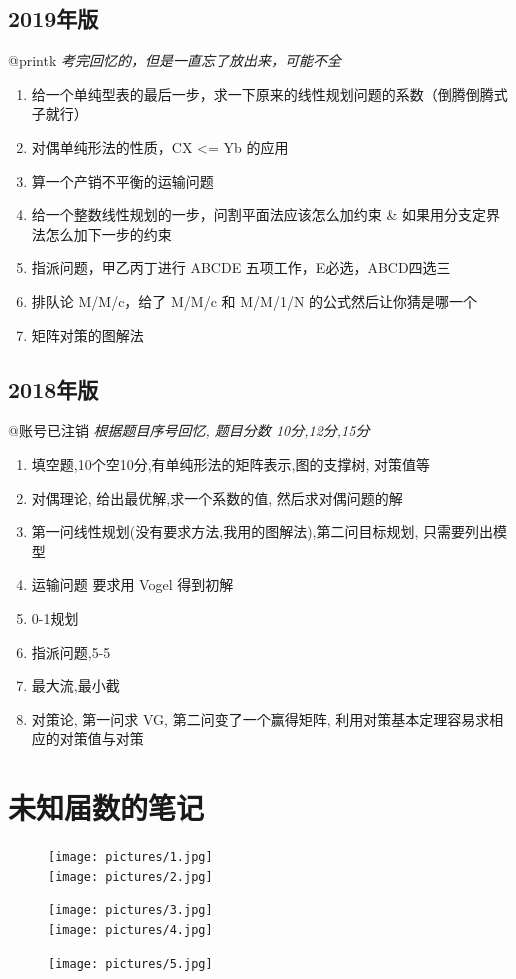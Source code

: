 \documentclass[]{report}
\begin{document}
		\section{2019年版}
		@printk\newline
		\textit{考完回忆的，但是一直忘了放出来，可能不全}
		\begin{enumerate}
			\item 给一个单纯型表的最后一步，求一下原来的线性规划问题的系数（倒腾倒腾式子就行）
			\item 对偶单纯形法的性质，CX <= Yb 的应用
			\item 算一个产销不平衡的运输问题
			\item 给一个整数线性规划的一步，问割平面法应该怎么加约束 \& 如果用分支定界法怎么加下一步的约束
			\item 指派问题，甲乙丙丁进行 ABCDE 五项工作，E必选，ABCD四选三
			\item 排队论 M/M/c，给了 M/M/c 和 M/M/1/N 的公式然后让你猜是哪一个
			\item 矩阵对策的图解法
		\end{enumerate}
		\section{2018年版}
		@账号已注销\newline
		\textit{根据题目序号回忆, 题目分数 10分,12分,15分}
		\begin{enumerate}
			\item 填空题,10个空10分,有单纯形法的矩阵表示,图的支撑树, 对策值等
			\item 对偶理论, 给出最优解,求一个系数的值, 然后求对偶问题的解
			\item 第一问线性规划(没有要求方法,我用的图解法),第二问目标规划, 只需要列出模型
			\item 运输问题 要求用 Vogel 得到初解
			\item 0-1规划
			\item 指派问题,5-5
			\item 最大流,最小截
			\item 对策论, 第一问求 VG, 第二问变了一个赢得矩阵, 利用对策基本定理容易求相应的对策值与对策
		\end{enumerate}

		\chapter{未知届数的笔记}
		\begin{figure}[h]
			\centering
			\texttt{[image: pictures/1.jpg]}\\[10pt]
			\texttt{[image: pictures/2.jpg]}
		\end{figure}
		\newpage
		\begin{figure}[h]
			\centering
			\texttt{[image: pictures/3.jpg]}\\[10pt]
			\texttt{[image: pictures/4.jpg]}
		\end{figure}
		\newpage
		\begin{figure}[h]
			\centering
			\texttt{[image: pictures/5.jpg]}\\[10pt]
		\end{figure}
\end{document}
